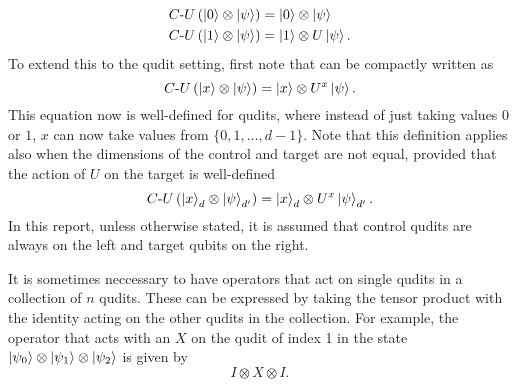 \begin{align}
    C\text{-}U\left(\ket{0}\otimes\ket{\psi}\right) &= \ket{0}\otimes\ket{\psi}
    \label{eq:controlled_0}\\
    C\text{-}U\left(\ket{1}\otimes\ket{\psi}\right) &= \ket{1}\otimes U\ket{\psi}.
    \label{eq:controlled_1}
\end{align}
To extend this to the qudit setting, first note that  can be compactly written as
\begin{equation}
    C\text{-}U\left(\ket{x}\otimes\ket{\psi}\right) = \ket{x}\otimes U^x\ket{\psi}.
    \label{eq:controlled_x}
\end{equation}
This equation now is well-defined for qudits, where instead of just taking values $0$ or $1$, $x$ can now take values from $\{0, 1, \dots, d-1\}$.
Note that this definition applies also when the dimensions of the control and target are not equal, provided that the action of $U$ on the target is well-defined
\begin{equation}
    C\text{-}U\left(\ket{x}_d\otimes\ket{\psi}_{d'}\right) = \ket{x}_d\otimes U^x\ket{\psi}_{d'}.
\end{equation}
In this report, unless otherwise stated, it is assumed that control qudits are always on the left and target qubits on the right.\newline

It is sometimes neccessary to have operators that act on single qudits in a collection of $n$ qudits.
These can be expressed by taking the tensor product with the identity acting on the other qudits in the collection.
For example, the operator that acts with an $X$ on the qudit of index 1 in the state $\ket{\psi_0}\otimes\ket{\psi_1}\otimes\ket{\psi_2}$ is given by
\begin{equation}
    I\otimes X\otimes I.
\end{equation}


